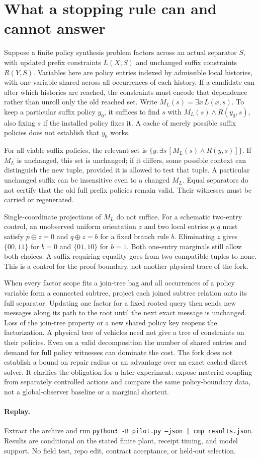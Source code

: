 \documentclass[11pt]{article}
\begin{document}
\section{What a stopping rule can and cannot answer}
Suppose a finite policy synthesis problem factors across an actual separator \(S\), with updated prefix constraints \(L(X,S)\) and unchanged suffix constraints \(R(Y,S)\). Variables here are policy entries indexed by admissible local histories, with one variable shared across all occurrences of each history. If a candidate can alter which histories are reached, the constraints must encode that dependence rather than unroll only the old reached set. Write \(M_L(s)=\exists x\, L(x,s)\). To keep a particular suffix policy \(y_0\), it suffices to find \(s\) with \(M_L(s)\land R(y_0,s)\), also fixing \(s\) if the installed policy fixes it. A cache of merely possible suffix policies does not establish that \(y_0\) works.

For all viable suffix policies, the relevant set is \(\{y:\exists s\, [M_L(s)\land R(y,s)]\}\). If \(M_L\) is unchanged, this set is unchanged; if it differs, some possible context can distinguish the new tuple, provided it is allowed to test that tuple. A particular unchanged suffix can be insensitive even to a changed \(M_L\). Equal separators do not certify that the old full prefix policies remain valid. Their witnesses must be carried or regenerated.

Single-coordinate projections of \(M_L\) do not suffice. For a schematic two-entry control, an unobserved uniform orientation \(z\) and two local entries \(p,q\) must satisfy \(p\oplus z=0\) and \(q\oplus z=b\) for a fixed branch rule \(b\). Eliminating \(z\) gives \(\{00,11\}\) for \(b=0\) and \(\{01,10\}\) for \(b=1\). Both one-entry marginals still allow both choices. A suffix requiring equality goes from two compatible tuples to none. This is a control for the proof boundary, not another physical trace of the fork.

When every factor scope fits a join-tree bag and all occurrences of a policy variable form a connected subtree, project each joined subtree relation onto its full separator. Updating one factor for a fixed rooted query then sends new messages along its path to the root until the next exact message is unchanged. Loss of the join-tree property or a new shared policy key reopens the factorization. A physical tree of vehicles need not give a tree of constraints on their policies. Even on a valid decomposition the number of shared entries and demand for full policy witnesses can dominate the cost. The fork does not establish a bound on repair radius or an advantage over an exact cached direct solver. It clarifies the obligation for a later experiment: expose material coupling from separately controlled actions and compare the same policy-boundary data, not a global-observer baseline or a marginal shortcut.

\paragraph{Replay.}
Extract the archive and run \texttt{python3 -B pilot.py --json | cmp results.json}. Results are conditional on the stated finite plant, receipt timing, and model support. No field test, repo edit, contract acceptance, or held-out selection.
\end{document}
